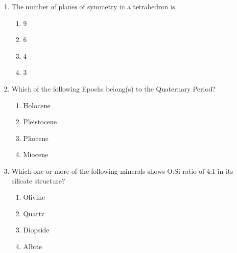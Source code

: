 \documentclass[journal,12pt,onecolumn]{IEEEtran}
\begin{document}
\begin{enumerate}
\hfill{}

\begin{enumerate}
    \item P-3, Q-4, R-2, S-1
    \item P-3, Q-4, R-1, S-2
    \item P-4, Q-3, R-2, S-1
    \item P-2, Q-1, R-4, S-3
\end{enumerate}
\newpage
\item The number of planes of symmetry in a tetrahedron is

\hfill{}

\begin{multicols}{4}
\begin{enumerate}
    \item 9
    \item 6
    \item 4
    \item 3
\end{enumerate}
\end{multicols}


\item Which of the following Epochs belong(s) to the Quaternary Period?  

\hfill{}

\begin{multicols}{2}
\begin{enumerate}
\item Holocene
\item Pleistocene
\item Pliocene
\item Miocene
\end{enumerate}
\end{multicols}

\item Which one or more of the following minerals shows O:Si ratio of 4:1 in its silicate structure?  

\hfill{}

\begin{multicols}{2}
\begin{enumerate}
\item Olivine
\item Quartz
\item Diopside
\item Albite
\end{enumerate}
\end{multicols}


\end{enumerate}
\end{document}
